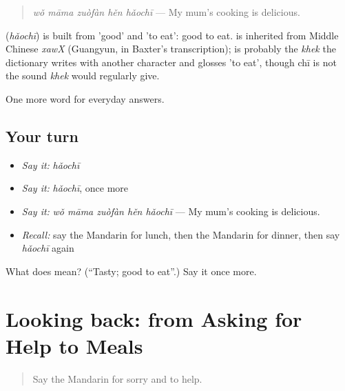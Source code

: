 \begin{quote}
\textbf{} \emph{wǒ māma zuòfàn hěn hǎochī} — My mum's cooking is delicious.
\end{quote}

\begin{cousinweb}
\textbf{} (\emph{hǎochī}) is built from  'good' and  'to eat': good to eat.  is inherited from Middle Chinese \emph{xawX} (Guangyun, in Baxter's transcription);  is probably the \emph{khek} the dictionary writes with another character and glosses 'to eat', though chī is not the sound \emph{khek} would regularly give.
\end{cousinweb}

\begin{grammarlens}[title={What you've built}]
One more word for everyday answers.
\end{grammarlens}

\subsection*{Your turn}
\begin{itemize}
\raggedright
  \item \emph{Say it:} \emph{hǎochī}
  \item \emph{Say it:} \emph{hǎochī}, once more
  \item \emph{Say it:} \emph{wǒ māma zuòfàn hěn hǎochī} — My mum's cooking is delicious.
  \item \emph{Recall:} say the Mandarin for lunch, then the Mandarin for dinner, then say \emph{hǎochī} again
\end{itemize}

\begin{tcolorbox}[breakable,colback=teal!4,colframe=teal!35!black,title={Before you move on}]
What does  mean? (\textquotedblleft{}Tasty; good to eat\textquotedblright{}.) Say it once more.
\end{tcolorbox}
\section[(dialogue)]{Looking back: from Asking for Help to Meals}

\label{lesson:ZH-R69-review-64-69}



\begin{quote}
Say the Mandarin for sorry and to help.
\end{quote}

